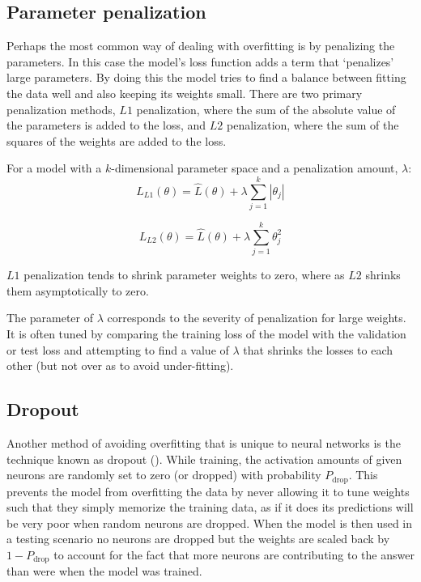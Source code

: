 \documentclass[]{book}
\theoremstyle{definition}
\theoremstyle{definition}
\theoremstyle{definition}
\theoremstyle{remark}
\let\BeginKnitrBlock\begin \let\EndKnitrBlock\end
\begin{document}
\subsection{Parameter penalization}\label{parameter-penalization}

Perhaps the most common way of dealing with overfitting is by penalizing
the parameters. In this case the model's loss function adds a term that
`penalizes' large parameters. By doing this the model tries to find a
balance between fitting the data well and also keeping its weights
small. There are two primary penalization methods, \(L1\) penalization,
where the sum of the absolute value of the parameters is added to the
loss, and \(L2\) penalization, where the sum of the squares of the
weights are added to the loss.

\BeginKnitrBlock{definition}[L1 penalization]
\protect\hypertarget{def:l1penalization}{}{\label{def:l1penalization}
{} }For a model with a \(k\)-dimensional
parameter space and a penalization amount, \(\lambda\):
\[L_{L1}(\theta) = \hat{L}(\theta) + \lambda \sum_{j = 1}^{k}|\theta_j|\]
\EndKnitrBlock{definition}

\BeginKnitrBlock{definition}[L2 penalization]
\protect\hypertarget{def:l2penalization}{}{\label{def:l2penalization}
{}
}\[L_{L2}(\theta) = \hat{L}(\theta) + \lambda \sum_{j = 1}^{k}\theta_j^2\]
\EndKnitrBlock{definition}

\(L1\) penalization tends to shrink parameter weights to zero, where as
\(L2\) shrinks them asymptotically to zero.

The parameter of \(\lambda\) corresponds to the severity of penalization
for large weights. It is often tuned by comparing the training loss of
the model with the validation or test loss and attempting to find a
value of \(\lambda\) that shrinks the losses to each other (but not over
as to avoid under-fitting).

\subsection{Dropout}\label{dropout}

Another method of avoiding overfitting that is unique to neural networks
is the technique known as dropout (\citet{dropout}). While training, the
activation amounts of given neurons are randomly set to zero (or
dropped) with probability \(P_{\text{drop}}\). This prevents the model
from overfitting the data by never allowing it to tune weights such that
they simply memorize the training data, as if it does its predictions
will be very poor when random neurons are dropped. When the model is
then used in a testing scenario no neurons are dropped but the weights
are scaled back by \(1 - P_{\text{drop}}\) to account for the fact that
more neurons are contributing to the answer than were when the model was
trained.
\end{document}
